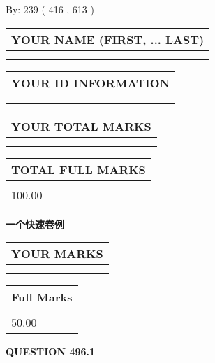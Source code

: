 \documentclass{ctexart}
\begin{document}
   
\hspace{1.0in} By: 
 239 ( 416 ,  613 )
   
   
   
   
\newpage 
\setcounter{page}{ 
   496001 } 
   
   
   
   
\noindent\begin{tabular}{|l|}
\hline
YOUR NAME (FIRST, ... LAST)  \\
\hline
 \\ 
 \\ 
\hline
\end{tabular}
\hspace{0.05in} \begin{tabular}{|l|}
\hline
 YOUR   ID   INFORMATION  \\
\hline
 \\ 
 \\ 
\hline
\end{tabular}
   
   
\vspace{0.2in}\noindent\begin{tabular}{|l|}
\hline
YOUR TOTAL MARKS  \\
\hline
 \\ 
 \\ 
\hline
\end{tabular}
\hspace{0.05in} \begin{tabular}{|l|}
\hline
TOTAL FULL MARKS  \\
\hline
 \\ 
100.00 \\
\hline
\end{tabular}
   
   
 \vspace{0.2in}
{\LARGE {\textbf{ 一个快速卷例}}}
   
   
  
\vspace{0.2in}
  
\noindent\begin{tabular}{|l|}
\hline
 YOUR MARKS  \\
\hline
 \\ 
 \\ 
\hline
\end{tabular}
\hspace{0.05in} \begin{tabular}{|l|}
\hline
 Full Marks  \\
\hline
 \\ 
50.00 \\
\hline
\end{tabular}
{\textbf{\Large{QUESTION
496.1 
}}}
  
\end{document}
